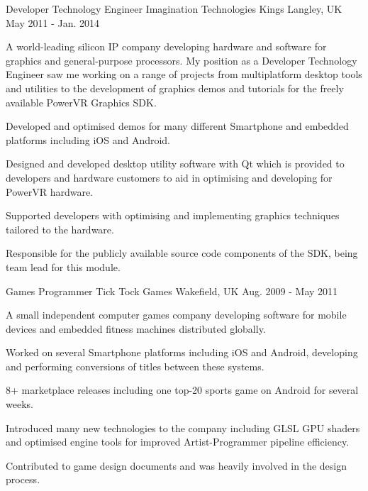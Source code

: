 \begin{cventries}
  \cventry
    {Developer Technology Engineer} %
    {Imagination Technologies} %
    {Kings Langley, UK} %
    {May 2011 - Jan. 2014} %
    {
      \begin{cventrysummary}
      A world-leading silicon IP company developing hardware and software for 
      graphics and general-purpose processors. My position as a Developer 
      Technology Engineer saw me working on a range of projects from 
      multiplatform desktop tools and utilities to the development of graphics
      demos and tutorials for the freely available PowerVR Graphics SDK.
      \end{cventrysummary}
      \begin{cvitems} %
        \item {Developed and optimised demos for many different Smartphone and embedded platforms including iOS and Android.}
        \item {Designed and developed desktop utility software with Qt which is provided to developers and hardware customers to aid in optimising and developing for PowerVR hardware.}
        \item {Supported developers with optimising and implementing graphics techniques tailored to the hardware.}
        \item {Responsible for the publicly available source code components of the SDK, being team lead for this module.}
      \end{cvitems}
    }

  \cventry
    {Games Programmer} %
    {Tick Tock Games} %
    {Wakefield, UK} %
    {Aug. 2009 - May 2011} %
    {
      \begin{cventrysummary}
      A small independent computer games company developing software for mobile
      devices and embedded fitness machines distributed globally.
      \end{cventrysummary}
      \begin{cvitems} %
        \item {Worked on several Smartphone platforms including iOS and Android, developing and performing conversions of titles between these systems. }
        \item {8+ marketplace releases including one top-20 sports game on Android for several weeks.}
        \item {Introduced many new technologies to the company including GLSL GPU shaders and optimised engine tools for improved Artist-Programmer pipeline efficiency.}
        \item {Contributed to game design documents and was heavily involved in the design process. }
      \end{cvitems}
    }

\end{cventries}
